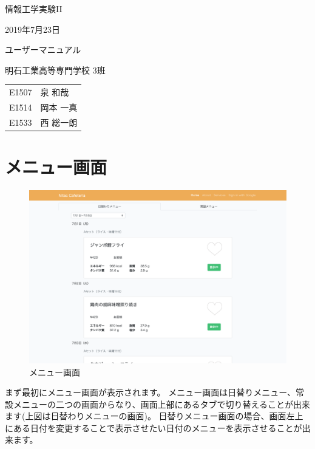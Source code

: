 \documentclass[a4paper]{ltjsarticle}
\begin{document}

\large
\vspace{-5.0cm}
\hspace{-1.0cm}
情報工学実験II

\hspace{-1.0cm}
2019年7月23日

\Huge
\vspace{1.0cm}
\begin{center}
    ユーザーマニュアル
\end{center}

\vspace{0.5cm}
\begin{center}
    \LARGE
    明石工業高等専門学校 3班
\end{center}

\LARGE
\begin{center}
    \begin{tabular}{rl}
        E1507 & 泉 和哉 \\
        E1514 & 岡本 一真 \\
        E1533 & 西 総一朗
    \end{tabular}
\end{center}

\normalsize

\tableofcontents
\thispagestyle{empty}
\clearpage
\setcounter{page}{1}


\section{メニュー画面}
    \begin{figure}[htbp]
        \centering
        \caption{メニュー画面}
        \includegraphics[scale = 0.3]{image/menu.png}
    \end{figure}
    まず最初にメニュー画面が表示されます。
    メニュー画面は日替りメニュー、常設メニューの二つの画面からなり、画面上部にあるタブで切り替えることが出来ます(上図は日替わりメニューの画面)。
    日替りメニュー画面の場合、画面左上にある日付を変更することで表示させたい日付のメニューを表示させることが出来ます。
    \newpage
\end{document}
